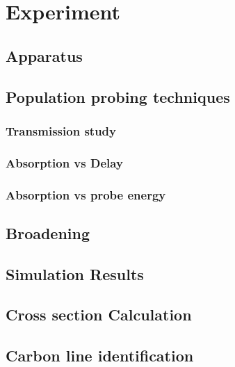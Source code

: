\chapter{Experiment\label{ch:experiment}}


\section{Apparatus}
\section{Population probing techniques}
\subsection{Transmission study}
\subsection{Absorption vs Delay}
\subsection{Absorption vs probe energy}
\section{Broadening}
\section{Simulation Results}
\section{Cross section Calculation}
\section{Carbon line identification}




%



